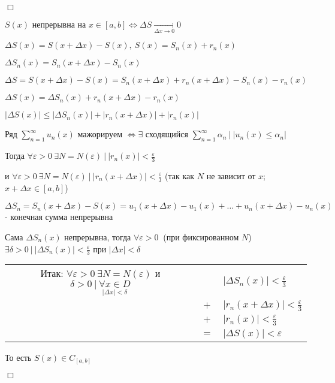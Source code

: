 \documentclass[12pt]{article}
\begin{document}
    \begin{MyProof}
        $\Box$

        $S(x)$ непрерывна на $x \in [a, b] \Longleftrightarrow \Delta S \underset{\Delta x \to 0}{\rightarrow} 0$

        $\Delta S(x) = S(x + \Delta x) - S(x), \ S(x) = S_n(x) + r_n(x)$

        $\Delta S_n(x) = S_n(x + \Delta x) - S_n(x)$

        $\Delta S = S(x + \Delta x) - S(x) = S_n(x + \Delta x) + r_n(x +  \Delta x) - S_n(x) - r_n(x)$

        $\Delta S(x) = \Delta S_n(x) + r_n(x + \Delta x) - r_n(x)$

        $|\Delta S(x)| \leq |\Delta S_n(x)| + |r_n(x + \Delta x)| + |r_n(x)|$

        Ряд $\sum_{n = 1}^\infty u_n(x)$ мажорируем $\Longleftrightarrow \exists$ сходящийся $\sum_{n = 1}^\infty \alpha_n \ \Big| \ |u_n(x) \leq \alpha_n|$
    
        Тогда $\forall \varepsilon > 0 \ \exists N = N(\varepsilon) \ | \ |r_n(x)| < \frac{\varepsilon}{3}$

        и $\forall \varepsilon > 0 \ \exists N = N(\varepsilon) \ | \ |r_n(x + \Delta x)| < \frac{\varepsilon}{3}$ (так как $N$ не зависит от $x$; $x + \Delta x \in [a, b]$) 
    
        $\Delta S_n = S_n(x + \Delta x) - S(x) = u_1(x + \Delta x) - u_1(x) + \dots + u_n(x + \Delta x) - u_n(x)$ - конечная сумма непрерывна

        Сама $\Delta S_n(x)$ непрерывна, тогда $\forall \varepsilon > 0 \ $ (при фиксированном $N$) $\exists \delta > 0 \ | \ |\Delta S_n(x)| < \frac{\varepsilon}{3}$ при $|\Delta x| < \delta$

        \bgroup
        \setlength\tabcolsep{1.5pt}
        \begin{tabular}{ccl}
            Итак: $\forall \varepsilon > 0 \ \exists N = N(\varepsilon)$ и $\delta > 0 \ | \ \underset{|\Delta x| < \delta}{\forall x \in D}$ & & $|\Delta S_n(x)| < \frac{\varepsilon}{3}$ \\
            
            & $+$ & $|r_n(x + \Delta x)| < \frac{\varepsilon}{3}$ \\ 
            
            & $+$ & $|r_n(x)| < \frac{\varepsilon}{3}$ \\

            & $=$ & $|\Delta S(x)| < \varepsilon$
        \end{tabular}
        \egroup

        То есть $S(x) \in C_{[a, b]}$

        $\Box$
    \end{MyProof}
\end{document}
